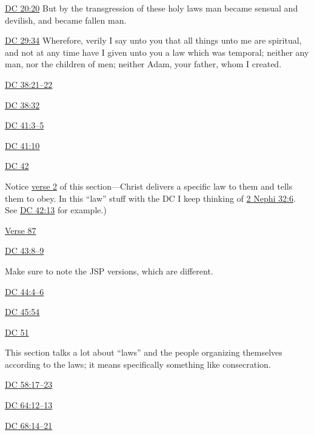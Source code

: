 		\begin{compactdesc}
			\item[{\hyperref[DC20-20]{DC 20:20}}] But by the transgression of these holy laws man became sensual and devilish, and became fallen man.
			\item[{\hyperref[DC29-34]{DC 29:34}}] Wherefore, verily I say unto you that all things unto me are spiritual, and not at any time have I given unto you a law which was temporal; neither any man, nor the children of men; neither Adam, your father, whom I created.
			\item[{\hyperref[DC38-21]{DC 38:21--22}}]
			\item[{\hyperref[DC38-32]{DC 38:32}}]
			\item[{\hyperref[DC41-3]{DC 41:3--5}}]
			\item[{\hyperref[DC41-10]{DC 41:10}}]
			\item[{\hyperref[DC42]{DC 42}}] \phantom{.}
				\begin{compactitem}
					\item Notice \hyperref[DC42-2]{verse 2} of this section---Christ delivers a specific law to them and tells them to obey. In this ``law'' stuff with the DC I keep thinking of \hyperref[2NEPHI-32-6]{2 Nephi 32:6}. See \hyperref[DC42-13]{DC 42:13} for example.)
					\item \hyperref[DC42-87]{Verse 87}
				\end{compactitem}
			\item[{\hyperref[DC43-8]{DC 43:8--9}}] \phantom{.}
				\begin{compactitem}
					\item Make sure to note the JSP versions, which are different.
				\end{compactitem}
			\item[{\hyperref[DC44-4]{DC 44:4--6}}]
			\item[{\hyperref[DC45-54]{DC 45:54}}]
			\item[{\hyperref[DC51]{DC 51}}] \phantom{.}
				\begin{compactitem}
					\item This section talks a lot about ``laws'' and the people organizing themselves according to the laws; it means specifically something like consecration.
				\end{compactitem}
			\item[{\hyperref[DC58-17]{DC 58:17--23}}]
			\item[{\hyperref[DC64-12]{DC 64:12--13}}]
			\item[{\hyperref[DC68-14]{DC 68:14--21}}] \phantom{.}

\end{compactdesc}
